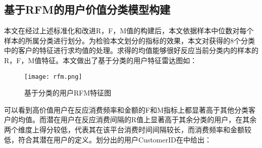 \documentclass[lang=cn,11pt,a4paper,cite=authoryear]{elegantpaper}
\begin{document}
\subsection{基于RFM的用户价值分类模型构建}
本文在经过上述标准化和改进R，F，M值的构建后，本文依据样本中位数对每个样本的所属分类进行划分。为检验本文划分的指标的效果，本文对获得的8个分类中的客户的特征进行求均值的处理。求得的均值能够很好反应当前分类内的样本的R，F，M值特征。本文做出了基于分类的用户特征雷达图如：
\begin{figure}[H]
  \centering
  \texttt{[image: rfm.png]}
  \caption{基于分类的用户RFM特征图}
  \label{用户特征图}
\end{figure}

可以看到高价值用户在反应消费频率和金额的F和M指标上都显著高于其他分类客户的均值。而潜在用户在反应消费间隔的R值上显著高于其余分类的用户，在其余两个维度上得分较低，代表其在该平台消费时间间隔较长，而消费频率和金额较低，符合其潜在用户的定义。划分出的用户CustomerID在中给出：
\end{document}
